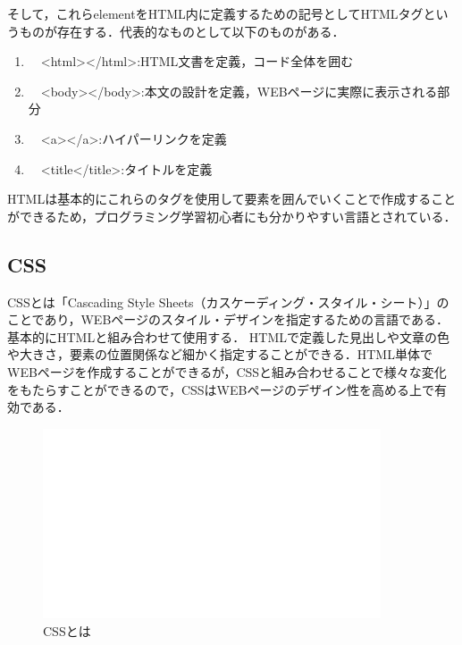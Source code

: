 \documentclass[12pt,a4j]{ltjsarticle}
\begin{document}
そして，これらelementをHTML内に定義するための記号としてHTMLタグというものが存在する．代表的なものとして以下のものがある．
\begin{enumerate}[label=(\roman*)]
	\item　<html></html>:HTML文書を定義，コード全体を囲む
	\item　<body></body>:本文の設計を定義，WEBページに実際に表示される部分
	\item　<a></a>:ハイパーリンクを定義
	\item　<title</title>:タイトルを定義
\end{enumerate}

HTMLは基本的にこれらのタグを使用して要素を囲んでいくことで作成することができるため，プログラミング学習初心者にも分かりやすい言語とされている．
\clearpage

\subsection{CSS}
CSSとは「Cascading Style Sheets（カスケーディング・スタイル・シート）」のことであり，WEBページのスタイル・デザインを指定するための言語である\cite{css}．
基本的にHTMLと組み合わせて使用する．
HTMLで定義した見出しや文章の色や大きさ，要素の位置関係など細かく指定することができる．HTML単体でWEBページを作成することができるが，CSSと組み合わせることで様々な変化をもたらすことができるので，CSSはWEBページのデザイン性を高める上で有効である．
\begin{figure}[h]
\begin{center}
\includegraphics[width = 100mm ] {figures/figure_sample.pdf}
\caption{CSSとは}
\end{center}
\label{fig:CSS}
\end{figure}
\end{document}
